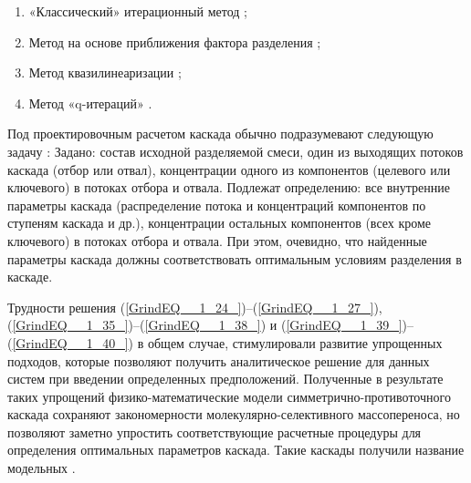 \begin{enumerate}
  \item «Классический» итерационный метод \cite{sulaberidzeTeoriyaKaskadovDlya2011, sazykinUsovershenstvovannyyMetodRascheta1997, wuCalculationMethodsDetermining1988};
  \item Метод на основе приближения фактора разделения \cite{holpanovEffektivnyyMetodRascheta1998};
  \item Метод квазилинеаризации \cite{sulaberidzeTeoriyaKaskadovDlya2011, potapovCalculationSquaredoffCascades1996};
  \item Метод «q-итераций» \cite{zengRobustEfficientCalculation2000}.
\end{enumerate}

Под проектировочным расчетом каскада обычно подразумевают следующую задачу \cite{sulaberidzeTeoriyaKaskadovDlya2011}:
Задано: состав исходной разделяемой смеси, один из выходящих потоков каскада (отбор или отвал), концентрации одного из компонентов (целевого или ключевого) в потоках отбора и отвала.
Подлежат определению: все внутренние параметры каскада (распределение потока и концентраций компонентов по ступеням каскада и др.), концентрации остальных компонентов (всех кроме ключевого) в потоках отбора и отвала. 
При этом, очевидно, что найденные параметры каскада должны соответствовать оптимальным условиям разделения в каскаде.

Трудности решения (\ref{GrindEQ__1_24_})--(\ref{GrindEQ__1_27_}), (\ref{GrindEQ__1_35_})--(\ref{GrindEQ__1_38_}) и (\ref{GrindEQ__1_39_})--(\ref{GrindEQ__1_40_}) в общем случае, стимулировали развитие упрощенных подходов, которые позволяют получить аналитическое решение для данных систем при введении определенных предположений. Полученные в результате таких упрощений физико-математические модели симметрично-противоточного каскада сохраняют закономерности молекулярно-селективного массопереноса, но позволяют заметно упростить соответствующие расчетные процедуры для определения оптимальных параметров каскада. Такие каскады получили название модельных \cite{minenkoTeoriiKaskadovDlya1965, delagarzaMulticomponentIsotopeSeparation1961, zhigalovskiyLekcionnyeMaterialyPo1999, kolokoltsovDesignCascadesSeparating1970, kolokolcovVoprosuPostroeniiKaskadov1970, minenkoPredelnoeObogashcheniePromezhutochnyh1972, yamamotoMulticomponentIsotopeSeparating1978, wuStudyMulticomponentIsotope, borisevichRascheteKaskadovDopolnitelnym1993, woodCriterionEffiencyMultiisotope1999, sulaberidzeOsobennostiObogashcheniyaKomponentov2006, sazykinKvaziidealnyeKaskadyDlya2000, sulaberidzeSravnenieOptimalnyhModelnyh2008}.

